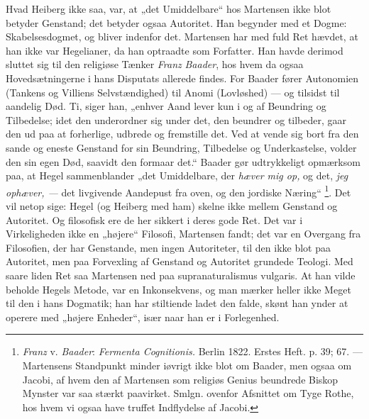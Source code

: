 \documentclass[12pt,a4paper,openany]{book}
\newcommand{\opage}[1]{\marginnote{\footnotesize\textit{[#1]}}}
\begin{document}
Hvad Heiberg ikke saa, var, at „det Umiddelbare“ hos Martensen ikke blot
betyder Genstand; det betyder ogsaa Autoritet. Han begynder med et Dogme:
Skabelsesdogmet, og bliver indenfor det. Martensen har med fuld Ret hævdet, at
han ikke var Hegelianer, da han optraadte som Forfatter. Han havde derimod
sluttet sig til den religiøse Tænker \emph{Franz} \emph{Baader}, hos hvem da
ogsaa Hovedsætningerne i
\setcounter{footnote}{0}%
\opage{141}hans Disputats allerede findes. For Baader fører Autonomien (Tankens
og Villiens Selvstændighed) til Anomi (Lovløshed) --- og tilsidst til aandelig
Død. Ti, siger han, „enhver Aand lever kun i og af Beundring og Tilbedelse;
idet den underordner sig under det, den beundrer og tilbeder, gaar den ud paa
at forherlige, udbrede og fremstille det. Ved at vende sig bort fra den sande
og eneste Genstand for sin Beundring, Tilbedelse og Underkastelse, volder den
sin egen Død, saavidt den formaar det.“ Baader gør udtrykkeligt opmærksom paa,
at Hegel sammenblander „det Umiddelbare, der \textit{hæver mig op,} og det,
\textit{jeg ophæver, ---} det livgivende Aandepust fra oven, og den jordiske Næring“%
\footnote[1]{\emph{Franz} v. \emph{Baader}: \textit{Fermenta Cognitionis.}
Berlin 1822. Erstes Heft. p. 39; 67. --- Martensens Standpunkt minder iøvrigt
ikke blot om Baader, men ogsaa om Jacobi, af hvem den af Martensen som religiøs
Genius beundrede Biskop Mynster var saa stærkt paavirket. Smlgn. ovenfor
Afsnittet om Tyge Rothe, hos hvem vi ogsaa have truffet Indflydelse af
Jacobi.}. Det vil netop sige: Hegel (og Heiberg med ham) skelne ikke mellem
Genstand og Autoritet. Og filosofisk ere de her sikkert i deres gode Ret. Det
var i Virkeligheden ikke en „højere“ Filosofi, Martensen fandt; det var en
Overgang fra Filosofien, der har Genstande, men ingen Autoriteter, til den ikke
blot paa Autoritet, men paa Forvexling af Genstand og Autoritet grundede
Teologi. Med saare liden Ret saa Martensen ned paa supranaturalismus vulgaris.
At han vilde beholde Hegels Metode, var en Inkonsekvens, og man mærker heller
ikke Meget til den i hans Dogmatik; han har stiltiende ladet den falde, skønt
han ynder at operere med „højere Enheder“, især naar han er i Forlegenhed.
\end{document}
